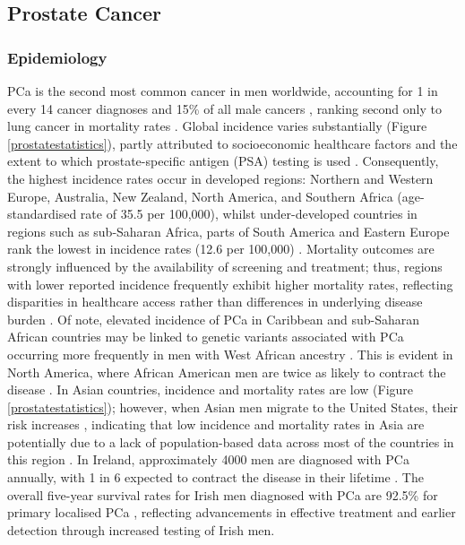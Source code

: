 \subsection{Prostate Cancer}
\subsubsection{Epidemiology}
PCa is the second most common cancer in men worldwide, accounting for 1 in every 14 cancer diagnoses and 15\% of all male cancers \cite{James2024Apr}, ranking second only to lung cancer in mortality rates \cite{BrayF}. Global incidence varies substantially (Figure \ref{prostatestatistics}), partly attributed to socioeconomic healthcare factors and the extent to which prostate-specific antigen (PSA) testing is used \cite{Culp2020Jan}. Consequently, the highest incidence rates occur in developed regions: Northern and Western Europe, Australia, New Zealand, North America, and Southern Africa (age-standardised rate of 35.5 per 100,000), whilst under-developed countries in regions such as sub-Saharan Africa, parts of South America and Eastern Europe rank the lowest in incidence rates (12.6 per 100,000) \cite{Nyame2020Jan}. Mortality outcomes are strongly influenced by the availability of screening and treatment; thus, regions with lower reported incidence frequently exhibit higher mortality rates, reflecting disparities in healthcare access rather than differences in underlying disease burden \cite{Nyame2020Jan}. Of note, elevated incidence of PCa in Caribbean and sub-Saharan African countries may be linked to genetic variants associated with PCa occurring more frequently in men with West African ancestry \cite{Culp2020Jan, Rebbeck2013Feb}. This is evident in North America, where African American men are twice as likely to contract the disease \cite{Brawley2012Sep}. In Asian countries, incidence and mortality rates are low (Figure \ref{prostatestatistics}); however, when Asian men migrate to the United States, their risk increases \cite{Kimura2012Sep}, indicating that low incidence and mortality rates in Asia are potentially due to a lack of population-based data across most of the countries in this region \cite{Baade2013Jun}.  In Ireland, approximately 4000 men are diagnosed with PCa annually, with 1 in 6 expected to contract the disease in their lifetime \cite{NCRI}. The overall five-year survival rates for Irish men diagnosed with PCa are 92.5\% for primary localised PCa \cite{NCRI}, reflecting advancements in effective treatment and earlier detection through increased testing of Irish men.

